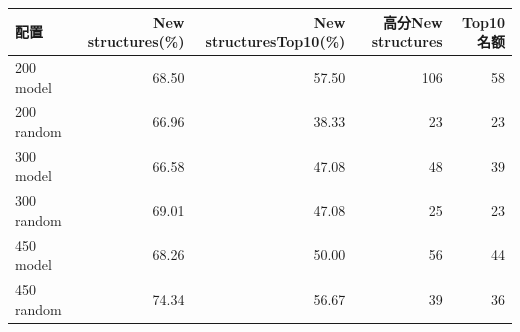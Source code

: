 \begin{tabular*}{\linewidth}{@{\extracolsep{\fill}}lrrrr@{}}
\toprule
配置 & New structures(\%) & New structuresTop10(\%) & 高分New structures & Top10名额\\
\midrule
200 model & 68.50 & 57.50 & 106 & 58 \\
200 random & 66.96 & 38.33 & 23 & 23 \\
300 model & 66.58 & 47.08 & 48 & 39 \\
300 random & 69.01 & 47.08 & 25 & 23 \\
450 model & 68.26 & 50.00 & 56 & 44 \\
450 random & 74.34 & 56.67 & 39 & 36 \\
\bottomrule
\end{tabular*}